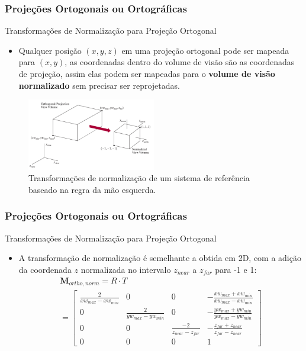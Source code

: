 \documentclass{beamer}
\begin{document}
\begin{frame}
\frametitle{Projeções Ortogonais ou Ortográficas}
	\begin{block}{Transformações de Normalização para Projeção Ortogonal}
		\begin{itemize}
			\item Qualquer posição $(x,y,z)$ em uma projeção ortogonal pode ser mapeada para $(x,y)$, as coordenadas dentro do volume de visão são as coordenadas de projeção, assim elas podem ser mapeadas para o \textbf{volume de visão normalizado} sem precisar ser reprojetadas.
		\end{itemize}
	\end{block}
	\begin{figure}[!h]
			\begin{center}
			\includegraphics[width=0.5\textwidth]{Figures/ProNor}
			\caption{Transformações de normalização de um sistema de referência baseado na regra da mão esquerda.}
			\end{center}
	\end{figure}
\end{frame}

\begin{frame}
\frametitle{Projeções Ortogonais ou Ortográficas}
	\begin{block}{Transformações de Normalização para Projeção Ortogonal}
		\begin{itemize}
			\item A transformação de normalização é semelhante a obtida em 2D, com a adição da coordenada $z$ normalizada no intervalo $z_{near}$ a $z_{far}$ para -1 e 1:
			\begin{eqnarray*}
				\textbf{M}_{ortho,norm} = R \cdot T  \\
					= \begin{bmatrix}
					\frac{2}{xw_{max} - xw_{min}}	&	0								&	0								&	- \frac{xw_{max}+xw_{min}}{xw_{max}-xw_{min}}	\\
					0								&	\frac{2}{yw_{max} - yw_{min}}	&	0								&	- \frac{yw_{max}+yw_{min}}{yw_{max}-yw_{min}}	\\
					0								&	0								&	\frac{-2}{z_{near} - z_{far}}	&	- \frac{z_{far}+z_{near}}{z_{far}-z_{near}}\\
					0								&	0	&	0	&	1
				\end{bmatrix}
			\end{eqnarray*}
		\end{itemize}
	\end{block}
\end{frame}
\end{document}
